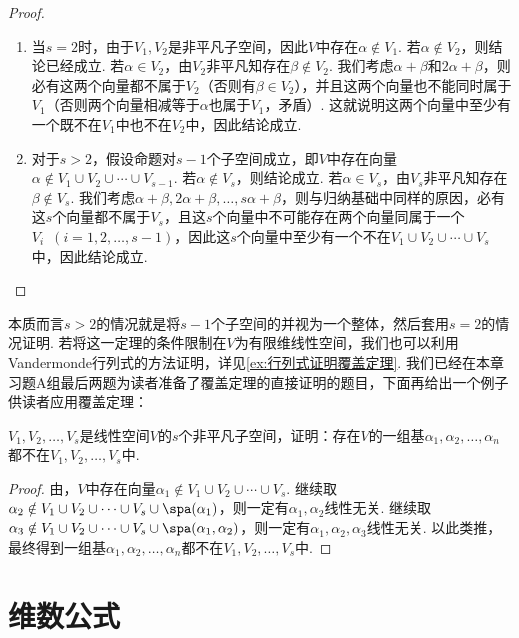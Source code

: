 \begin{proof}
    \begin{enumerate}
        \item 当$s=2$时，由于$V_1,V_2$是非平凡子空间，因此$V$中存在$\alpha\notin V_1$. 若$\alpha\notin V_2$，则结论已经成立. 若$\alpha\in V_2$，由$V_2$非平凡知存在$\beta\notin V_2$. 我们考虑$\alpha+\beta$和$2\alpha+\beta$，则必有这两个向量都不属于$V_2$（否则有$\beta\in V_2$），并且这两个向量也不能同时属于$V_1$（否则两个向量相减等于$\alpha$也属于$V_1$，矛盾）. 这就说明这两个向量中至少有一个既不在$V_1$中也不在$V_2$中，因此结论成立.

        \item 对于$s>2$，假设命题对$s-1$个子空间成立，即$V$中存在向量$\alpha\notin V_1\cup V_2\cup\cdots\cup V_{s-1}$. 若$\alpha\notin V_s$，则结论成立. 若$\alpha\in V_s$，由$V_s$非平凡知存在$\beta\notin V_s$. 我们考虑$\alpha+\beta,2\alpha+\beta,\ldots,s\alpha+\beta$，则与归纳基础中同样的原因，必有这$s$个向量都不属于$V_s$，且这$s$个向量中不可能存在两个向量同属于一个$V_i\enspace(i=1,2,\ldots,s-1)$，因此这$s$个向量中至少有一个不在$V_1\cup V_2\cup\cdots\cup V_s$中，因此结论成立.
    \end{enumerate}
\end{proof}

本质而言$s>2$的情况就是将$s-1$个子空间的并视为一个整体，然后套用$s=2$的情况证明. 若将这一定理的条件限制在$V$为有限维线性空间，我们也可以利用Vandermonde行列式的方法证明，详见\autoref{ex:行列式证明覆盖定理}. 我们已经在本章习题A组最后两题为读者准备了覆盖定理的直接证明的题目，下面再给出一个例子供读者应用覆盖定理：
\begin{example}{}{}
    $V_1,V_2,\ldots,V_s$是线性空间$V$的$s$个非平凡子空间，证明：存在$V$的一组基$\alpha_1,\alpha_2,\ldots,\alpha_n$都不在$V_1,V_2,\ldots,V_s$中.
\end{example}

\begin{proof}
    由，$V$中存在向量$\alpha_1\notin V_1\cup V_2\cup\cdots\cup V_s$. 继续取$\alpha_2\notin V_1\cup V_2\cup\cdots\cup V_s\cup\spa(\alpha_1)$，则一定有$\alpha_1,\alpha_2$线性无关. 继续取$\alpha_3\notin V_1\cup V_2\cup\cdots\cup V_s\cup\spa(\alpha_1,\alpha_2)$，则一定有$\alpha_1,\alpha_2,\alpha_3$线性无关. 以此类推，最终得到一组基$\alpha_1,\alpha_2,\ldots,\alpha_n$都不在$V_1,V_2,\ldots,V_s$中.
\end{proof}

\section{维数公式}

